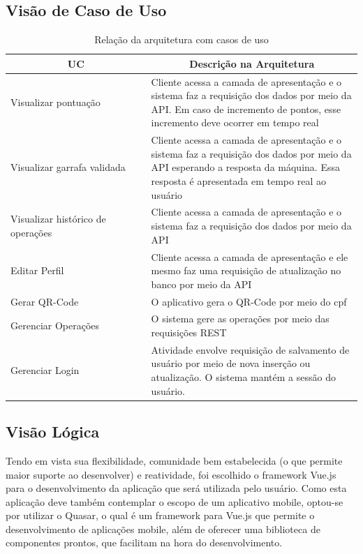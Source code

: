 \begin{apendicesenv}
\subsection{Visão de Caso de Uso}
\begin{table}[htp]
    \centering
    \caption{Relação da arquitetura com casos de uso}
    \label{my-label}
    \begin{tabular}{|p{0.40\linewidth}|p{0.60\linewidth}|}
        \hline
        \multicolumn{1}{|c|}{\textbf{UC}} & \multicolumn{1}{c|}{\textbf{Descrição na Arquitetura}} \\ \hline
        Visualizar pontuação    & Cliente acessa a camada de apresentação e o sistema faz a requisição dos dados por meio da API. Em caso de incremento de pontos, esse incremento deve ocorrer em tempo real \\ \hline
        Visualizar garrafa validada    & Cliente acessa a camada de apresentação e o sistema faz a requisição dos dados por meio da API esperando a resposta da máquina. Essa resposta é apresentada em tempo real ao usuário \\ \hline
        Visualizar histórico de operações    & Cliente acessa a camada de apresentação e o sistema faz a requisição dos dados por meio da API \\ \hline
        Editar Perfil    & Cliente acessa a camada de apresentação e ele mesmo faz uma requisição de atualização no banco por meio da API \\ \hline
        Gerar QR-Code    & O aplicativo gera o QR-Code por meio do cpf \\ \hline
        Gerenciar Operações    & O sistema gere as operações por meio das requisições REST \\ \hline
        Gerenciar Login    & Atividade envolve requisição de salvamento de usuário por meio de nova inserção ou atualização. O sistema mantém a sessão do usuário. \\ \hline
    \end{tabular}
\end{table}

\subsection{Visão Lógica}
Tendo em vista sua flexibilidade, comunidade bem estabelecida (o que permite maior suporte ao desenvolver) e reatividade, foi escolhido o framework Vue.js para o desenvolvimento da aplicação que será utilizada pelo usuário. Como esta aplicação deve também contemplar o escopo de um aplicativo mobile, optou-se por utilizar o Quasar, o qual é um framework para Vue.js que permite o desenvolvimento de aplicações mobile, além de oferecer uma biblioteca de componentes prontos, que facilitam na hora do desenvolvimento.


\end{apendicesenv}
